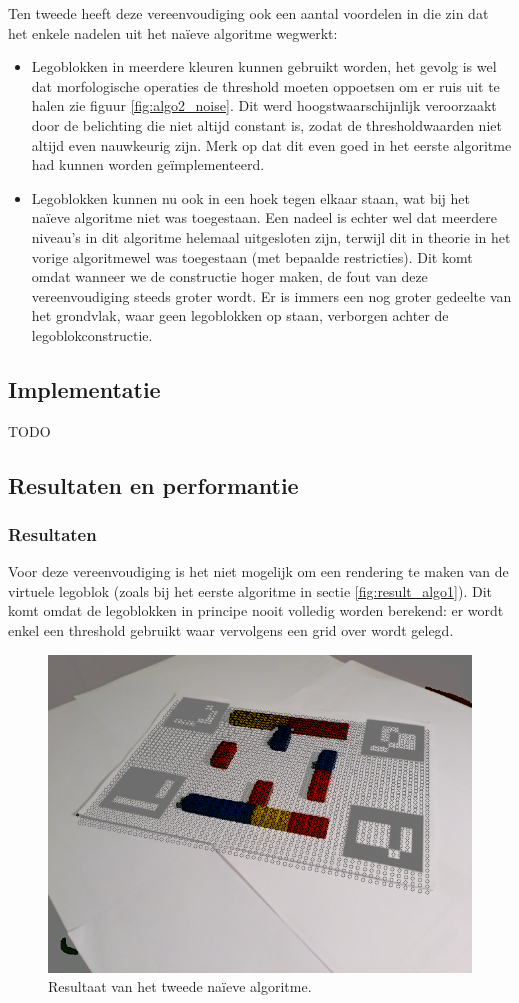 Ten tweede heeft deze vereenvoudiging ook een aantal voordelen in die zin dat het enkele nadelen uit het na\"ieve algoritme wegwerkt:
\begin{itemize}
\item Legoblokken in meerdere kleuren kunnen gebruikt worden, het gevolg is wel dat morfologische operaties de threshold moeten oppoetsen om er ruis uit te halen zie figuur \ref{fig:algo2_noise}. Dit werd hoogstwaarschijnlijk veroorzaakt door de belichting die niet altijd constant is, zodat de thresholdwaarden niet altijd even nauwkeurig zijn. Merk op dat dit even goed in het eerste algoritme had kunnen worden ge\"implementeerd.
\item Legoblokken kunnen nu ook in een hoek tegen elkaar staan, wat bij het na\"ieve algoritme niet was toegestaan. Een nadeel is echter wel dat meerdere niveau's in dit algoritme helemaal uitgesloten zijn, terwijl dit in theorie in het vorige algoritmewel was toegestaan (met bepaalde restricties). Dit komt omdat wanneer we de constructie hoger maken, de fout van deze vereenvoudiging steeds groter wordt. Er is immers een nog groter gedeelte van het grondvlak, waar geen legoblokken op staan, verborgen achter de legoblokconstructie.
\end{itemize}

\subsection{Implementatie} \label{naive_vereenv_impl}

TODO %

\subsection{Resultaten en performantie} \label{naive_vereenv_res}

\subsubsection*{Resultaten}
Voor deze vereenvoudiging is het niet mogelijk om een rendering te maken van de virtuele legoblok (zoals bij het eerste algoritme in sectie \ref{fig:result_algo1}). Dit komt omdat de legoblokken in principe nooit volledig worden berekend: er wordt enkel een threshold gebruikt waar vervolgens een grid over wordt gelegd.

\begin{figure}
  \centering
  \includegraphics[width=.5\linewidth]{img/alg2}
  \caption{Resultaat van het tweede na\"ieve algoritme.}
  \label{fig:algo2_res}
\end{figure}

